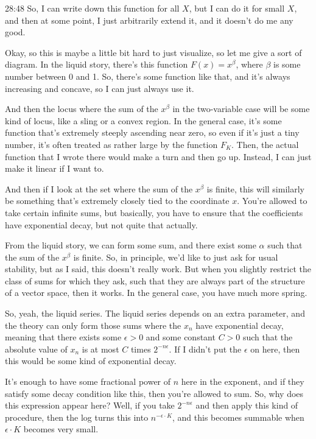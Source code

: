 \begin{unfinished}{28:48}
So, I can write down this function for all $X$, but I can do it for small $X$, and then at some point, I just arbitrarily extend it, and it doesn't do me any good.

Okay, so this is maybe a little bit hard to just visualize, so let me give a sort of diagram. In the liquid story, there's this function $F(x) = x^{\beta}$, where $\beta$ is some number between 0 and 1. So, there's some function like that, and it's always increasing and concave, so I can just always use it.

And then the locus where the sum of the $x^{\beta}$ in the two-variable case will be some kind of locus, like a sling or a convex region. In the general case, it's some function that's extremely steeply ascending near zero, so even if it's just a tiny number, it's often treated as rather large by the function $F_K$. Then, the actual function that I wrote there would make a turn and then go up. Instead, I can just make it linear if I want to.

And then if I look at the set where the sum of the $x^{\beta}$ is finite, this will similarly be something that's extremely closely tied to the coordinate $x$. You're allowed to take certain infinite sums, but basically, you have to ensure that the coefficients have exponential decay, but not quite that actually.

From the liquid story, we can form some sum, and there exist some $\alpha$ such that the sum of the $x^{\beta}$ is finite. So, in principle, we'd like to just ask for usual stability, but as I said, this doesn't really work. But when you slightly restrict the class of sums for which they ask, such that they are always part of the structure of a vector space, then it works. In the general case, you have much more spring.

So, yeah, the liquid series. The liquid series depends on an extra parameter, and the theory can only form those sums where the $x_n$ have exponential decay, meaning that there exists some $\epsilon > 0$ and some constant $C > 0$ such that the absolute value of $x_n$ is at most $C$ times $2^{-n\epsilon}$. If I didn't put the $\epsilon$ on here, then this would be some kind of exponential decay.

It's enough to have some fractional power of $n$ here in the exponent, and if they satisfy some decay condition like this, then you're allowed to sum. So, why does this expression appear here? Well, if you take $2^{-n\epsilon}$ and then apply this kind of procedure, then the log turns this into $n^{-\epsilon\cdot K}$, and this becomes summable when $\epsilon\cdot K$ becomes very small.


\end{unfinished}
